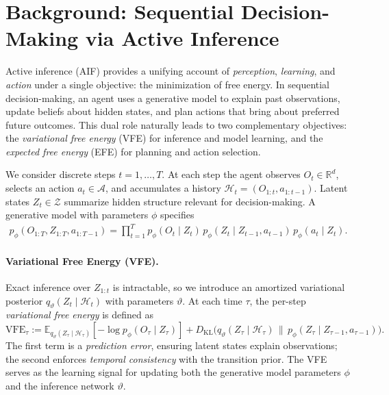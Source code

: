 \documentclass{article} %
\begin{document}
\section{Background: Sequential Decision-Making via Active Inference}
\label{sec:background}

Active inference (AIF) provides a unifying account of \emph{perception}, \emph{learning}, and \emph{action} under a single objective: the minimization of free energy.  
In sequential decision-making, an agent uses a generative model to explain past observations, update beliefs about hidden states, and plan actions that bring about preferred future outcomes.  
This dual role naturally leads to two complementary objectives: the \emph{variational free energy} (VFE) for inference and model learning, and the \emph{expected free energy} (EFE) for planning and action selection.  

We consider discrete steps $t=1,\dots,T$.  
At each step the agent observes $O_t \in \mathbb{R}^d$, selects an action $a_t \in \mathcal{A}$, and accumulates a history
$
\mathcal H_t = (O_{1:t}, a_{1:t-1}).
$
Latent states $Z_t \in \mathcal Z$ summarize hidden structure relevant for decision-making.  
A generative model with parameters $\phi$ specifies
{\small \begin{align}
p_\phi(O_{1:T}, Z_{1:T}, a_{1:T-1})
= \prod_{t=1}^T p_\phi(O_t \mid Z_t)\,
p_\phi(Z_t \mid Z_{t-1},a_{t-1})\,
p_\phi(a_t \mid Z_t).
\label{eq:generative_1}
\end{align}}
\paragraph{Variational Free Energy (VFE).}
Exact inference over $Z_{1:t}$ is intractable, so we introduce an amortized variational posterior 
$q_\vartheta(Z_t \mid \mathcal H_t)$ with parameters $\vartheta$.  
At each time $\tau$, the per-step \emph{variational free energy} is defined as
{\small\begin{equation}
\text{VFE}_\tau :=
\mathbb{E}_{q_\vartheta(Z_\tau\mid\mathcal H_\tau)}[-\log p_\phi(O_\tau\mid Z_\tau)]
+ D_{\mathrm{KL}}\!\big(q_\vartheta(Z_\tau\mid \mathcal H_\tau)\,\|\,p_\phi(Z_\tau\mid Z_{\tau-1},a_{\tau-1})\big).
\label{eq:per_step_VFE}
\end{equation}}
The first term is a \emph{prediction error}, ensuring latent states explain observations;  
the second enforces \emph{temporal consistency} with the transition prior.  
The VFE serves as the learning signal for updating both the generative model parameters $\phi$ and the inference network $\vartheta$.    
\end{document}
